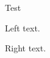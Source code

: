 \documentclass[noamsthm]{beamer}
\begin{document}
\begin{frame}{Test}

\begin{minipage}{\textwidth}
\begin{pairs}
\begin{Leftside} 

\beginnumbering
\pstart
Left text.
\pend
\endnumbering
\end{Leftside}

\begin{Rightside}
\beginnumbering
\pstart
Right text.
\pend
\endnumbering
\end{Rightside}
\end{pairs}
\Columns
\end{minipage}

\end{frame}
\end{document}
